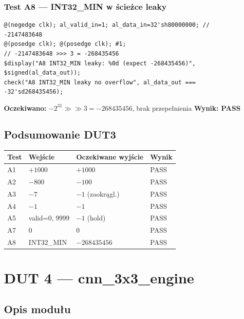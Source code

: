 \documentclass[12pt,a4paper]{article}
\begin{document}
\subsubsection*{Test A8 — INT32\_MIN w ścieżce leaky}

\begin{lstlisting}
@(negedge clk); al_valid_in=1; al_data_in=32'sh80000000; // -2147483648
@(posedge clk); @(posedge clk); #1;
// -2147483648 >>> 3 = -268435456
$display("A8 INT32_MIN leaky: %0d (expect -268435456)", $signed(al_data_out));
check("A8 INT32_MIN leaky no overflow", al_data_out === -32'sd268435456);
\end{lstlisting}

\textbf{Oczekiwano:} $-2^{31} \gg\gg 3 = -268435456$, brak przepełnienia \quad \textbf{Wynik: PASS}

\subsection{Podsumowanie DUT3}

\begin{center}
\begin{tabular}{llll}
\toprule
\textbf{Test} & \textbf{Wejście} & \textbf{Oczekiwane wyjście} & \textbf{Wynik} \\
\midrule
A1 & $+1000$ & $+1000$ & PASS \\
A2 & $-800$ & $-100$ & PASS \\
A3 & $-7$ & $-1$ (zaokrągl.) & PASS \\
A4 & $-1$ & $-1$ & PASS \\
A5 & valid=0, $9999$ & $-1$ (hold) & PASS \\
A7 & $0$ & $0$ & PASS \\
A8 & INT32\_MIN & $-268435456$ & PASS \\
\bottomrule
\end{tabular}
\end{center}

\section{DUT 4 — cnn\_3x3\_engine}

\subsection{Opis modułu}
\end{document}
